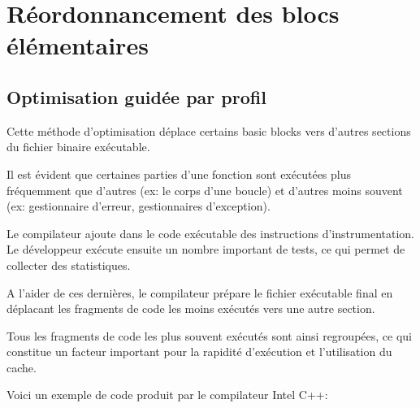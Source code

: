 ﻿\section{Réordonnancement des blocs élémentaires}


\subsection{Optimisation guidée par profil}
\label{PGO}

\myindex{\oracle}

Cette méthode d'optimisation déplace certains \gls{basic block}s vers d'autres sections du fichier 
binaire exécutable.

Il est évident que certaines parties d'une fonction sont exécutées plus fréquemment que d'autres
(ex: le corps d'une boucle) et d'autres moins souvent (ex: gestionnaire d'erreur, gestionnaires 
d'exception).

Le compilateur ajoute dans le code exécutable des instructions d'instrumentation. Le développeur 
exécute ensuite un nombre important de tests, ce qui permet de collecter des statistiques.

A l'aider de ces dernières, le compilateur prépare le fichier exécutable final en déplacant les 
fragments de code les moins exécutés vers une autre section.

Tous les fragments de code les plus souvent exécutés sont ainsi regroupées, ce qui constitue un 
facteur important pour la rapidité d'exécution et l'utilisation du cache.

Voici un exemple de code \oracle produit par le compilateur Intel C++:

